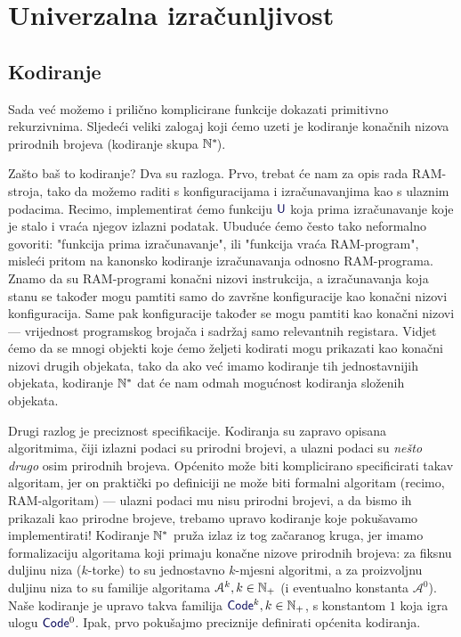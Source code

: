 \chapter{Univerzalna izračunljivost}\label{ch:univ}

\section{Kodiranje}

Sada već možemo i prilično komplicirane funkcije dokazati primitivno rekurzivnima. Sljedeći veliki zalogaj koji ćemo uzeti je kodiranje konačnih nizova prirodnih brojeva (kodiranje skupa ${\mathbb N}^*\mspace{-2mu}$).

Zašto baš to kodiranje? Dva su razloga. Prvo, trebat će nam za opis rada RAM-stroja, tako da možemo raditi s konfiguracijama i izračunavanjima kao s ulaznim podacima. Recimo, implementirat ćemo funkciju $\f U$ koja prima izračunavanje koje je stalo i vraća njegov izlazni podatak. Ubuduće ćemo često tako neformalno govoriti: "funkcija prima izračunavanje", ili "funkcija vraća RAM-program", misleći  pritom na kanonsko kodiranje izračunavanja odnosno RAM-programa. Znamo da su RAM-programi konačni nizovi instrukcija, a izračunavanja koja stanu se također mogu pamtiti samo do završne konfiguracije kao konačni nizovi konfiguracija. Same pak konfiguracije također se mogu pamtiti kao konačni nizovi --- vrijednost programskog brojača i sadržaj samo relevantnih registara. Vidjet ćemo da se mnogi objekti koje ćemo željeti kodirati mogu prikazati kao konačni nizovi drugih objekata, tako da ako već imamo kodiranje tih jednostavnijih objekata, kodiranje ${\mathbb N}^*$ dat će nam odmah mogućnost kodiranja složenih objekata.

Drugi razlog je preciznost specifikacije. Kodiranja su zapravo opisana algoritmima, čiji izlazni podaci su prirodni brojevi, a ulazni podaci su \emph{nešto drugo} osim prirodnih brojeva. Općenito može biti komplicirano specificirati takav algoritam, jer on praktički po definiciji ne može biti formalni algoritam (recimo, RAM-algoritam) --- ulazni podaci mu nisu prirodni brojevi, a da bismo ih prikazali kao prirodne brojeve, trebamo upravo kodiranje koje pokušavamo implementirati! Kodiranje ${\mathbb N}^*$ pruža izlaz iz tog začaranog kruga, jer imamo formalizaciju algoritama koji primaju konačne nizove prirodnih brojeva: za fiksnu duljinu niza ($k$-torke) to su jednostavno $k$-mjesni algoritmi, a za proizvoljnu duljinu niza to su familije algoritama $\mathcal A^k,k\in{\mathbb N}_+$ (i eventualno konstanta $\mathcal A^0$). Naše kodiranje je upravo takva familija $\f{Code}^k,k\in\N_+$, s konstantom $1$ koja igra ulogu $\f{Code}^0$. Ipak, prvo pokušajmo preciznije definirati općenita kodiranja.

